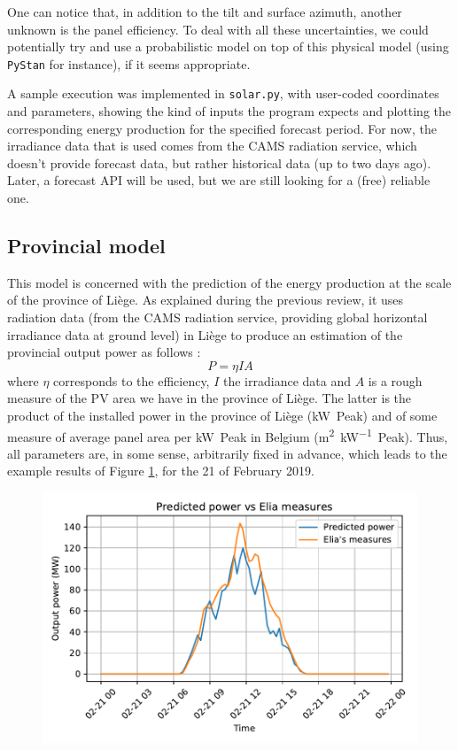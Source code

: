 \documentclass[a4paper, 12pt]{article}
\begin{document}
	One can notice that, in addition to the tilt and surface azimuth, another unknown is the panel efficiency. To deal with all these uncertainties, we could potentially try and use a probabilistic model on top of this physical model (using \texttt{PyStan} for instance), if it seems appropriate.
	
	A sample execution was implemented in \texttt{solar.py}, with user-coded coordinates and parameters, showing the kind of inputs the program expects and plotting the corresponding energy production for the specified forecast period. For now, the irradiance data that is used comes from the CAMS radiation service, which doesn't provide forecast data, but rather historical data (up to two days ago). Later, a forecast API will be used, but we are still looking for a (free) reliable one.
	
	\subsection{Provincial model}

	This model is concerned with the prediction of the energy production at the scale of the province of Liège. As explained during the previous review, it uses radiation data (from the CAMS radiation service, providing global horizontal irradiance data at ground level) in Liège to produce an estimation of the provincial output power as follows :
	\begin{equation*}
	    P = \eta I A
	\end{equation*}
	where $\eta$ corresponds to the efficiency, $I$ the irradiance data and $A$ is a rough measure of the PV area we have in the province of Liège. The latter is the product of the installed power in the province of Liège (\si{\kilo\watt Peak}) and of some measure of average panel area per \si{\kilo\watt Peak} in Belgium (\si{\meter\squared\per\kilo\watt Peak}). Thus, all parameters are, in some sense, arbitrarily fixed in advance, which leads to the example results of Figure \ref{fig:province_example}, for the 21 of February 2019.
	
	\begin{figure}[H]
	    \centering
	    \includegraphics[width=.75\textwidth]{resources/pdf/province_example.pdf}
	    \label{fig:province_example}
	\end{figure}
	
\end{document}
